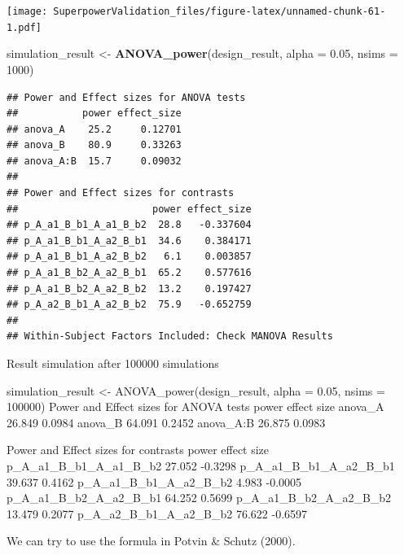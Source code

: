 \documentclass[]{book}
\newenvironment{Shaded}{\begin{snugshade}}{\end{snugshade}}
\newcommand{\DataTypeTok}[1]{\textcolor[rgb]{0.13,0.29,0.53}{#1}}
\newcommand{\DecValTok}[1]{\textcolor[rgb]{0.00,0.00,0.81}{#1}}
\newcommand{\FloatTok}[1]{\textcolor[rgb]{0.00,0.00,0.81}{#1}}
\newcommand{\KeywordTok}[1]{\textcolor[rgb]{0.13,0.29,0.53}{\textbf{#1}}}
\newcommand{\NormalTok}[1]{#1}
\newcommand{\StringTok}[1]{\textcolor[rgb]{0.31,0.60,0.02}{#1}}
\begin{document}
\texttt{[image: SuperpowerValidation\_files/figure-latex/unnamed-chunk-61-1.pdf]}

\begin{Shaded}
\begin{Highlighting}[]
\NormalTok{simulation_result <-}\StringTok{ }\KeywordTok{ANOVA_power}\NormalTok{(design_result, }\DataTypeTok{alpha =} \FloatTok{0.05}\NormalTok{, }\DataTypeTok{nsims =} \DecValTok{1000}\NormalTok{)}
\end{Highlighting}
\end{Shaded}

\begin{verbatim}
## Power and Effect sizes for ANOVA tests
##           power effect_size
## anova_A    25.2     0.12701
## anova_B    80.9     0.33263
## anova_A:B  15.7     0.09032
## 
## Power and Effect sizes for contrasts
##                       power effect_size
## p_A_a1_B_b1_A_a1_B_b2  28.8   -0.337604
## p_A_a1_B_b1_A_a2_B_b1  34.6    0.384171
## p_A_a1_B_b1_A_a2_B_b2   6.1    0.003857
## p_A_a1_B_b2_A_a2_B_b1  65.2    0.577616
## p_A_a1_B_b2_A_a2_B_b2  13.2    0.197427
## p_A_a2_B_b1_A_a2_B_b2  75.9   -0.652759
## 
## Within-Subject Factors Included: Check MANOVA Results
\end{verbatim}

Result simulation after 100000 simulations

simulation\_result \textless- ANOVA\_power(design\_result, alpha = 0.05, nsims = 100000)
Power and Effect sizes for ANOVA tests
power effect size
anova\_A 26.849 0.0984
anova\_B 64.091 0.2452
anova\_A:B 26.875 0.0983

Power and Effect sizes for contrasts
power effect size
p\_A\_a1\_B\_b1\_A\_a1\_B\_b2 27.052 -0.3298
p\_A\_a1\_B\_b1\_A\_a2\_B\_b1 39.637 0.4162
p\_A\_a1\_B\_b1\_A\_a2\_B\_b2 4.983 -0.0005
p\_A\_a1\_B\_b2\_A\_a2\_B\_b1 64.252 0.5699
p\_A\_a1\_B\_b2\_A\_a2\_B\_b2 13.479 0.2077
p\_A\_a2\_B\_b1\_A\_a2\_B\_b2 76.622 -0.6597

We can try to use the formula in Potvin \& Schutz (2000).
\end{document}
